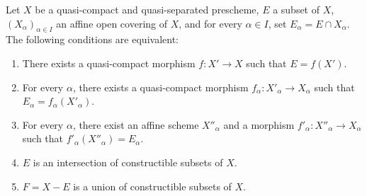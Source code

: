 \begin{proposition}[1.9.3]
\label{IV.1.9.3}
Let $X$ be a quasi-compact and quasi-separated prescheme, $E$ a subset of
$X$, $(X_\alpha)_{\alpha\in I}$ an affine open covering of $X$, and for
every $\alpha\in I$, set $E_\alpha=E\cap X_\alpha$. The following conditions
are equivalent:
\begin{enumerate}
  \item[a)] There exists a quasi-compact morphism $f:X'\to X$ such that
  $E=f(X')$.
  \item[a$'$)] For every $\alpha$, there exists a quasi-compact morphism
  $f_\alpha:X'_\alpha\to X_\alpha$ such that
  $E_\alpha=f_\alpha(X'_\alpha)$.
  \item[a$''$)] For every $\alpha$, there exist an affine scheme $X''_\alpha$
  and a morphism $f'_\alpha:X''_\alpha\to X_\alpha$ such that
  $f'_\alpha(X''_\alpha)=E_\alpha$.
  \item[b)] $E$ is an intersection of constructible subsets of $X$.
  \item[b$'$)] $F=X-E$ is a union of constructible subsets of $X$.
\end{enumerate}
\end{proposition}

